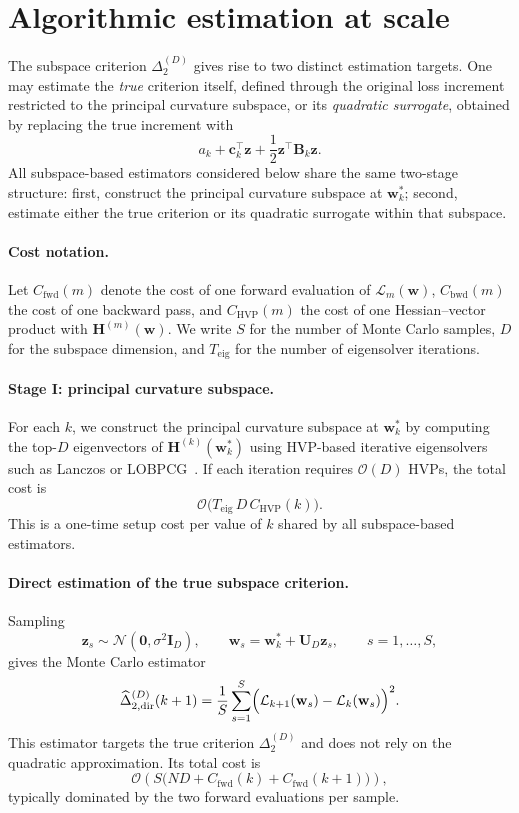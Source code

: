 \documentclass[10pt]{article}
\theoremstyle{plain}
\theoremstyle{remark}
\begin{document}
\section{Algorithmic estimation at scale}
\label{sec:algo}

The subspace criterion $\Delta_2^{(D)}$ gives rise to two distinct estimation targets.
One may estimate the \emph{true} criterion itself, defined through the original loss increment restricted to the principal curvature subspace, or its \emph{quadratic surrogate}, obtained by replacing the true increment with
\[
a_k + \mathbf c_k^\top \mathbf z + \frac12 \mathbf z^\top \mathbf B_k \mathbf z.
\]
All subspace-based estimators considered below share the same two-stage structure:
first, construct the principal curvature subspace at $\mathbf w_k^*$; second, estimate either the true criterion or its quadratic surrogate within that subspace.

\paragraph{Cost notation.}
Let $C_{\mathrm{fwd}}(m)$ denote the cost of one forward evaluation of $\mathcal L_m(\mathbf w)$, $C_{\mathrm{bwd}}(m)$ the cost of one backward pass, and $C_{\mathrm{HVP}}(m)$ the cost of one Hessian--vector product with $\mathbf H^{(m)}(\mathbf w)$.
We write $S$ for the number of Monte Carlo samples, $D$ for the subspace dimension, and $T_{\mathrm{eig}}$ for the number of eigensolver iterations.

\paragraph{Stage I: principal curvature subspace.}
For each $k$, we construct the principal curvature subspace at $\mathbf w_k^*$ by computing the top-$D$ eigenvectors of $\mathbf H^{(k)}(\mathbf w_k^*)$ using HVP-based iterative eigensolvers such as Lanczos or LOBPCG~\citep{pearlmutter1994fast}.
If each iteration requires $\mathcal O(D)$ HVPs, the total cost is
\[
\mathcal O\!\bigl(T_{\mathrm{eig}}\,D\,C_{\mathrm{HVP}}(k)\bigr).
\]
This is a one-time setup cost per value of $k$ shared by all subspace-based estimators.

\paragraph{Direct estimation of the true subspace criterion.}
Sampling
\[
\mathbf z_s \sim \mathcal N(\mathbf 0,\sigma^2\mathbf I_D),
\qquad
\mathbf w_s=\mathbf w_k^*+\mathbf U_D\mathbf z_s,
\qquad
s=1,\dots,S,
\]
gives the Monte Carlo estimator
\begin{equation}
\label{eq:direct-subspace-mc}
\widehat{\Delta}_{2,\mathrm{dir}}^{(D)}(k+1)
=
\frac{1}{S}\sum_{s=1}^S
\Bigl(
\mathcal L_{k+1}(\mathbf w_s)-\mathcal L_k(\mathbf w_s)
\Bigr)^2.
\end{equation}
This estimator targets the true criterion $\Delta_2^{(D)}$ and does not rely on the quadratic approximation.
Its total cost is
\[
\mathcal O\!\left(
S\bigl(
ND + C_{\mathrm{fwd}}(k)+C_{\mathrm{fwd}}(k+1)
\bigr)
\right),
\]
typically dominated by the two forward evaluations per sample.
\end{document}
